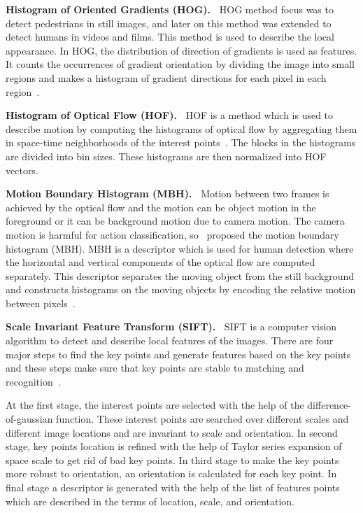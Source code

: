\noindent
\textbf{Histogram of Oriented Gradients (HOG).~}
HOG method focus was to detect pedestrians in still images, and later on this method was extended to detect humans in videos and films. This method is used to describe the local appearance. In HOG, the distribution of direction of gradients is used as features. It counts the occurrences of gradient orientation by dividing the image into small regions and makes a histogram of gradient directions for each pixel in each region~\cite{1467360}.%

\noindent
\textbf{Histogram of Optical Flow (HOF).~}
HOF is a method which is used to describe motion by computing the histograms of optical flow by aggregating them in space-time neighborhoods of the interest points~\cite{Laptev2005}. The blocks in the histograms are divided into bin sizes. These histograms are then normalized into HOF vectors. %

\noindent
\textbf{Motion Boundary Histogram (MBH).~}
Motion between two frames is achieved by the optical flow and the motion can be object motion in the foreground or it can be background motion due to camera motion. The camera motion is harmful for action classification, so~\cite{dalal2006human} proposed the motion boundary histogram (MBH). MBH is a descriptor which is used for human detection where the horizontal and vertical components of the optical flow are computed separately. This descriptor separates the moving object from the still background and constructs histograms on the moving objects by encoding the relative motion between pixels~\cite{wang2013dense}. %

\noindent
\textbf{Scale Invariant Feature Transform (SIFT).~}
SIFT is a computer vision algorithm to detect and describe local features of the images. There are four major steps to find the key points and generate features based on the key points and these steps make sure that key points are stable to matching and recognition~\cite{Lowe:2004:DIF:993451.996342}. 

At the first stage, the interest points are selected with the help of the difference-of-gaussian function. These interest points are searched over different scales and different image locations and are invariant to scale and orientation. In second stage, key points location is refined with the help of Taylor series expansion of space scale to get rid of bad key points. In third stage to make the key points more robust to orientation, an orientation is calculated for each key point. In final stage a descriptor is generated with the help of the list of features points which are described in the terms of location, scale, and orientation.

